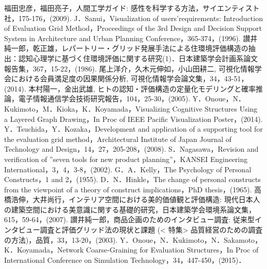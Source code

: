 \documentclass[syuuron]{kuee}
\begin{document}


\begin{thebibliography}{数字}
	 福田忠彦，福田亮子，人間工学ガイド: 感性を科学する方法，サイエンティスト社，175-176，(2009).
	 J．Sanui，Visualization of users’requirements: Introduction of Evaluation Grid Method，Proceedings of the 3rd Design and Decision Support System in Architecture and Urban Planning Conference，365-374，(1996).
	 讃井純一郎，乾正雄，レパートリー・グリッド発展手法による住環境評価構造の抽出：認知心理学に基づく住環境評価に関する研究(1)．日本建築学会計画系論文報告集，367，15-22，(1986).
	 尾上洋介，久木元伸如，小山田耕二, 可視化情報学会における会員満足度の因果関係分析, 可視化情報学会論文集，34，43-51，(2014).
	 本村陽一，金出武雄, ヒトの認知・評価構造の定量化モデリングと確率推論，電子情報通信学会技術研究報告，104，25-30，(2005).
	 Y．Onoue，N．Kukimoto，M．Kioka，K．Koyamada，Visualizing Cognitive Structures Using a Layered Graph Drawing，In Proc of IEEE Pacific Visualization Poster，(2014).
	 Y．Tsuchida，Y．Kozaka，Development and application of a supporting tool for the evaluation grid method，Architectural Institute of Japan Journal of Technology and Design，14，27，205-208，(2008).
	 S．Nagasawa，Revision and verification of ”seven tools for new product planning”，KANSEI Engineering International，3，4，3-8，(2002).
	 G．A．Kelly，The Psychology of Personal Constructs，1 and 2，(1955).
	 D．N．Hinkle，The change of personal constructs from the viewpoint of a theory of construct implications，PhD thesis，(1965).
	 高橋浩伸，大井尚行，インテリア空間における美的価値観と評価構造: 現代日本人の建築空間における美意識に関する基礎的研究，日本建築学会環境系論文集，615，59-64，(2007).
	 讃井純一郎，商品企画のためのインタビュー調査: 従来型インタビュー調査と評価グリッド法の現状と課題 (< 特集> 品質経営のための調査の方法)，品質，33，13-20，(2003).
	 Y．Onoue，N．Kukimoto，N．Sakamoto，K．Koyamada，Network Coarse-Graining for Evaluation Structures，In Proc of International Conference on Simulation Technology，34，447-450，(2015)．

\end{thebibliography}
\end{document}
